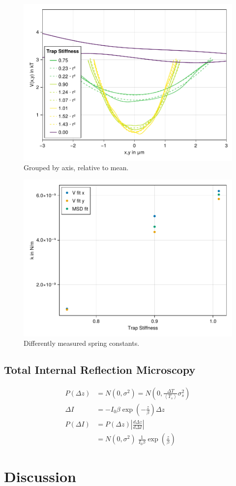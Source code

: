 \documentclass[
    parskip=half, 
    twoside=false,
    twocolumn=true,
    fontsize=11pt,
]{scrarticle}
\begin{document}
\begin{figure}[h]
    \centering
    \includegraphics{figures/01_03_3_axis.pdf}
    \caption{Grouped by axis, relative to mean.}
\end{figure}

\begin{figure}[h]
    \centering
    \includegraphics{figures/01_03_4_spring_constants.pdf}
    \caption{Differently measured spring constants.}
\end{figure}

\clearpage
\subsection{Total Internal Reflection Microscopy}
\begin{align}
    P(\Delta z) &= N(0, \sigma^2) = N\left(0, \frac{\Delta T}{\left<T_s\right>} \sigma_s^2\right)\\
    \Delta I &= - I_0 \beta \exp\left(-\frac{z}{\beta}\right) \Delta z \\
    P(\Delta I) &= P(\Delta z) \left|\frac{d \Delta z}{d \Delta I}\right|\\
    &= N(0, \sigma^2) \;\frac{1}{I_0\beta} \exp\left(\frac{z}{\beta}\right)
\end{align}

\clearpage
\section{Discussion}
\end{document}
